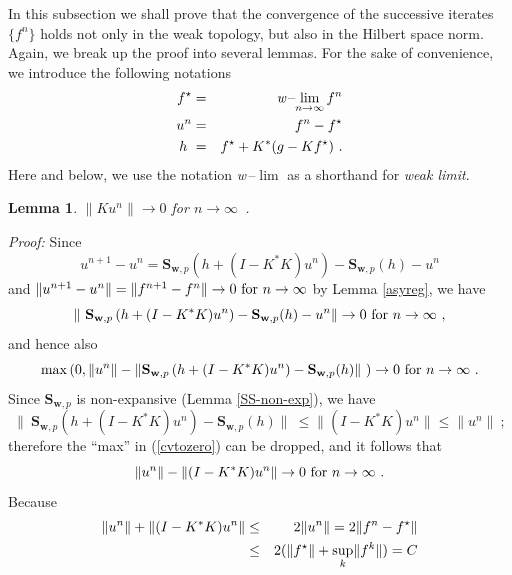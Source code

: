 \documentclass[10pt]{article}
\newtheorem{lemma}[theorem]{Lemma}
\def\S{\mathbf{S}}
\def\K{K^*}
\begin{document}
In this subsection we shall prove that the convergence of the successive
iterates
$\{f^n\}$ holds not only in the weak topology, but also in the Hilbert
space norm.
Again, we break up the proof into several lemmas. For the sake of convenience,
we introduce the following notations
\begin{eqnarray}
f^\star&=& \mbox{{\em w}\! --\!}\lim_{n \to \infty} f^n \nonumber \\
u^n &=& f^n - f^\star \nonumber \\ %
h\ &=& f^\star + \K (g-Kf^\star)\ . \label{redef2}
\end{eqnarray}
Here and below, we use the notation {\em w}$\,$--$\lim$ as a shorthand
for {\em weak limit}.
\begin{lemma}
\label{Ku}
$\| Ku^n \| \to 0$ for $n \to \infty$\ .
\end{lemma}
{\em Proof:}
Since
\begin{equation*}
u^{n+1} - u^n = {\S}_{\mathbf{w},p}\left( h+(I-K^*K)u^n\right) -
{\S}_{\mathbf{w},p}(h) - u^n
\end{equation*}
and $\|u^{n+1} - u^n \| = \| f^{n+1} - f^n \| \to 0\ {\rm for}\ n
\to \infty$ by Lemma \ref{asyreg}, we have
\begin{equation}
\|\ {\S}_{\mathbf{w},p}\left( h+(I-K^*K)u^n\right) - {\S}_{\mathbf{w},p}(h) -
u^n \| \to 0 \  {\rm for}\ n \to \infty ~,
\label{cvaux}
\end{equation}
and hence also
\begin{equation}
 \max\left(0,\| u^n \|- \|{\S}_{\mathbf{w},p}\left( h+(I-K^*K)u^n\right) -
{\S}_{\mathbf{w},p}(h)\|\ \right) \to 0 \ {\rm for}\  n \to \infty\ .
\label{cvtozero}
\end{equation}
Since ${\S}_{\mathbf{w},p}$ is non-expansive
(Lemma \ref{SS-non-exp}), we have
\begin{equation*}
\| \ {\S_{\mathbf{w},p}}\left( h+(I-K^*K)u^n\right) - {\S}_{\mathbf{w},p}(h) \|
\ \leq
\| (I-K^*K)u^n \| \leq \| u^n \|~;
\end{equation*}
therefore the ``max'' in  (\ref{cvtozero}) can be dropped, and it follows that
\begin{equation}
\| u^n \| - \| (I-K^*K)u^n \|  \to 0 \ {\rm for}\  n \to \infty \ .
\label{cv2}
\end{equation}
Because
\begin{eqnarray*}
\| u^n \| + \| (I-K^*K)u^n \| &\leq& 2\| u^n\| = 2\|f^n-f^\star\|\\
&\leq& 2(\| f^\star\|+ {\mathop{\rm sup}_{k}} \| f^k\|) = C
\end{eqnarray*}
\end{document}
